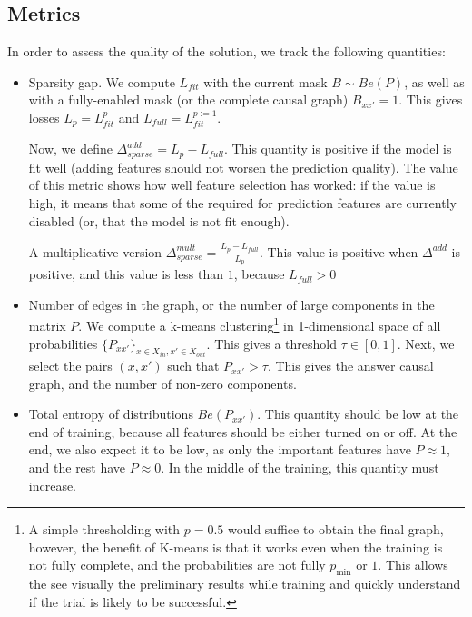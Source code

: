 \documentclass[a4paper,11pt,oneside]{report}
\begin{document}
\subsection{Metrics}
In order to assess the quality of the solution, we track the following quantities:
\begin{itemize}
    \item Sparsity gap. We compute $L_{fit}$ with the current mask $B\sim Be(P)$, as well as with a fully-enabled mask (or the complete causal graph) $B_{xx'}=1$. This gives losses $L_p=L_{fit}^{p}$ and $L_{full}=L_{fit}^{p:=1}$.

    Now, we define $\Delta^{add}_{sparse}=L_p-L_{full}$. This quantity is positive if the model is fit well (adding features should not worsen the prediction quality). The value of this metric shows how well feature selection has worked: if the value is high, it means that some of the required for prediction features are currently disabled (or, that the model is not fit enough).

    A multiplicative version $\Delta^{mult}_{sparse}=\frac{L_p-L_{full}}{L_p}$. This value is positive when $\Delta^{add}$ is positive, and this value is less than $1$, because $L_{full}>0$

    \item Number of edges in the graph, or the number of large components in the matrix $P$. We compute a k-means clustering\footnote{A simple thresholding with $p=0.5$ would suffice to obtain the final graph, however, the benefit of K-means is that it works even when the training is not fully complete, and the probabilities are not fully $p_{\min}$ or $1$. This allows the see visually the preliminary results while training and quickly understand if the trial is likely to be successful.} in 1-dimensional space of all probabilities $\{P_{xx'}\}_{x\in X_{in},x'\in X_{out}}$. This gives a threshold $\tau\in[0,1]$. Next, we select the pairs $(x, x')$ such that $P_{xx'}>\tau$. This gives the answer causal graph, and the number of non-zero components.

    \item Total entropy of distributions $Be(P_{xx'})$. This quantity should be low at the end of training, because all features should be either turned on or off. At the end, we also expect it to be low, as only the important features have $P\approx 1$, and the rest have $P\approx 0$. In the middle of the training, this quantity must increase.
\end{itemize}
\end{document}
